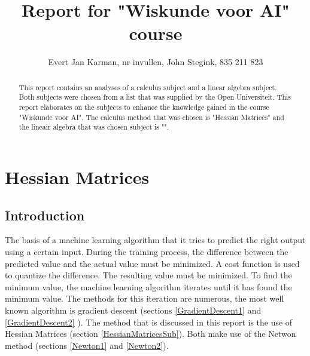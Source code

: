 \documentclass[journal]{IEEEtran}
\begin{document}
\title{Report for "Wiskunde voor AI" course}

\author{
Evert Jan Karman, nr invullen, %
John Stegink,  835 211 823
}%
        
\maketitle

\begin{abstract}
This report contains an analyses of a calculus subject and a linear algebra subject. Both subjects were chosen from a list that was supplied by the Open Universiteit. This report elaborates on the subjects to enhance the knowledge gained in the course "Wiskunde voor AI". The calculus method that was chosen is "Hessian Matrices" and the lineair algebra that was chosen subject is "".
\end{abstract}


\section{Hessian Matrices}
\label{HessianMatrices}

\subsection{Introduction}
The basis of a machine learning algorithm that it tries to predict the right output using a certain input. During the training process, the difference between the predicted value and the actual value must be minimized. A cost function is used to quantize the difference. The resulting value must be minimized. To find the minimum value, the machine learning algorithm iterates until it has found the minimum value. The methods for this iteration are numerous, the most well known algorithm is gradient descent (sections \ref{GradientDescent1} and \ref{GradientDescent2} ). The method that is discussed in this report is the use of Hessian Matrices (section \ref{HessianMatricesSub}). Both make use of the Netwon method (sections \ref{Newton1} and \ref{Newton2}).
\end{document}
